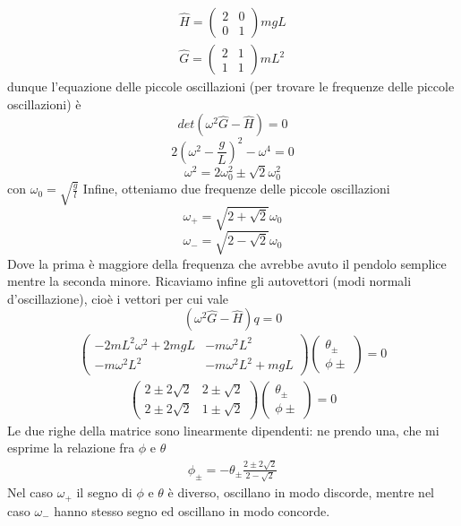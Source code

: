 \documentclass[
10pt, %
a4paper, %
oneside, %
headinclude,footinclude, %
BCOR5mm, %
]{scrartcl}
\begin{document}
\begin{esercizio}
\begin{align*}
	\hat{H} =
	\begin{pmatrix}
		2&0\\
		0&1
	\end{pmatrix}
mgL\\
\hat{G} =
\begin{pmatrix}
	2&1\\
	1&1
\end{pmatrix}
mL^2
\end{align*}
dunque l'equazione delle piccole oscillazioni (per trovare le frequenze delle piccole oscillazioni)	è
\[det(\omega^2\hat{G}-\hat{H}) = 0\]
\[2(\omega^2-\frac{g}{L})^2-\omega^4 = 0\]
\[\omega^2 = 2\omega_0^2\pm\sqrt{2}\omega_0^2\]
con \(\omega_0 = \sqrt{\frac{g}{l}}\)
Infine, otteniamo due frequenze delle piccole oscillazioni
\[\omega_+ = \sqrt{2+\sqrt{2}}\omega_0\]
\[\omega_- = \sqrt{2-\sqrt{2}}\omega_0\]
Dove la prima è maggiore della frequenza che avrebbe avuto il pendolo semplice mentre la seconda minore. Ricaviamo infine gli autovettori (modi normali d'oscillazione), cioè i vettori per cui vale
\[(\omega^2\hat{G}-\hat{H})q = 0\]
\begin{align*}
	\begin{pmatrix}
		-2mL^2\omega^2+2mgL&-m\omega^2L^2\\
		-m\omega^2L^2&-m\omega^2L^2+mgL
	\end{pmatrix}
\begin{pmatrix}
	\theta_\pm\\
	\phi\pm
\end{pmatrix}=0
\end{align*}
\begin{align*}
\begin{pmatrix}
2\pm2\sqrt{2}&2\pm\sqrt{2}\\
2\pm2\sqrt{2}&1\pm\sqrt{2}
\end{pmatrix}
\begin{pmatrix}
	\theta_\pm\\
	\phi\pm
\end{pmatrix}=0
\end{align*}
Le due righe della matrice sono linearmente dipendenti: ne prendo una, che mi esprime la relazione fra $\phi$ e \(\theta\) 
\begin{align*}
	\phi_\pm = -\theta_\pm\frac{2\pm2\sqrt{2}}{2-\sqrt{2}}
\end{align*}
Nel caso \(\omega_+\) il segno di \(\phi\) e \(\theta\) è diverso, oscillano in modo discorde, mentre nel caso \(\omega_-\) hanno stesso segno ed oscillano in modo concorde. 
	
	
	
	
	
	
	
	
	
	
	
	
	
	
	
\end{esercizio}
\newpage
\end{document}
